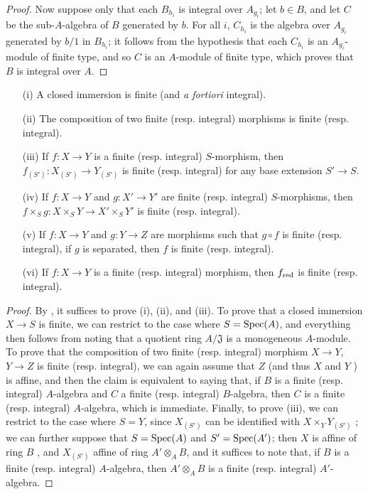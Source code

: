 \begin{proof}
Now suppose only that each $B_{h_i}$ is integral over $A_{g_i}$;
let $b\in B$, and let $C$ be the sub-$A$-algebra of $B$ generated by $b$.
For all $i$, $C_{h_i}$ is the algebra over $A_{g_i}$ generated by $b/1$ in $B_{h_i}$;
it follows from the hypothesis that each $C_{h_i}$ is an $A_{g_i}$-module of finite type, and so  $C$ is an $A$-module of finite type, which proves that $B$ is integral over $A$.
\end{proof}

\begin{proposition}[6.1.5]
\label{II.6.1.5}
\medskip\noindent
\begin{enumerate}
  \item[(i)] A closed immersion is finite (and \emph{a fortiori} integral).
  \item[(ii)] The composition of two finite (resp. integral) morphisms is finite (resp. integral).
  \item[(iii)] If $f:X\to Y$ is a finite (resp. integral) $S$-morphism, then $f_{(S')}:X_{(S')}\to Y_{(S')}$ is finite (resp. integral) for any base extension $S'\to S$.
  \item[(iv)] If $f:X\to Y$ and $g:X'\to Y'$ are finite (resp. integral) $S$-morphisms, then $f\times_S g:X\times_S Y\to X'\times_S Y'$ is finite (resp. integral).
  \item[(v)] If $f:X\to Y$ and $g:Y\to Z$ are morphisms such that $g\circ f$ is finite (resp. integral), if $g$ is separated, then $f$ is finite (resp. integral).
  \item[(vi)] If $f:X\to Y$ is a finite (resp. integral) morphism, then $f_{\mathrm{red}}$ is finite (resp. integral).
\end{enumerate}
\end{proposition}

\begin{proof}
By , it suffices to prove (i), (ii), and (iii).
To prove that a closed immersion $X\to S$ is finite, we can restrict to the case where $S=\operatorname{Spec}(A)$, and everything then follows from noting that a quotient ring $A/\mathfrak{J}$ is a monogeneous $A$-module.
To prove that the composition of two finite (resp. integral) morphism $X\to Y$, $Y\to Z$ is finite (resp. integral), we can again assume that $Z$ (and thus $X$ and $Y$ ) is affine, and then the claim is equivalent to saying that, if $B$ is a finite (resp. integral) $A$-algebra and $C$ a finite (resp. integral) $B$-algebra, then $C$ is a finite (resp. integral) $A$-algebra, which is immediate.
Finally, to prove (iii), we can restrict to the case where $S=Y$, since $X_{(S')}$ can be identified with $X\times_Y Y_{(S')}$ ;
we can further suppose that $S=\operatorname{Spec}(A)$ and $S'=\operatorname{Spec}(A')$;
then $X$ is affine of ring $B$ , and $X_{(S')}$ affine of ring $A'\otimes_A B$, and it suffices to note that, if $B$ is a finite (resp. integral) $A$-algebra, then $A'\otimes_A B$ is a finite (resp. integral) $A'$-algebra.
\end{proof}


